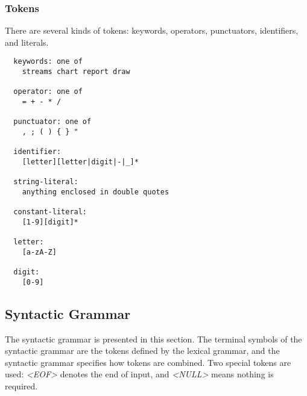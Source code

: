 \subsubsection{Tokens}
There are several kinds of tokens: keywords, operators, punctuators, identifiers, and literals.
\begin{verbatim}    
  keywords: one of
    streams chart report draw

  operator: one of
    = + - * /  
    
  punctuator: one of
    , ; ( ) { } "
    
  identifier:
    [letter][letter|digit|-|_]*

  string-literal:
    anything enclosed in double quotes
    
  constant-literal:
    [1-9][digit]*  
    
  letter:
    [a-zA-Z]
    
  digit:
    [0-9]
\end{verbatim}


 
     
     
     

\subsection{Syntactic Grammar}

The syntactic grammar is presented in this section. The terminal symbols of the syntactic grammar are the tokens defined by the lexical grammar, and the syntactic grammar specifies how tokens are combined. Two special tokens are used: \textit{\textless EOF\textgreater} denotes the end of input, and \textit{\textless NULL\textgreater} means nothing is required.


